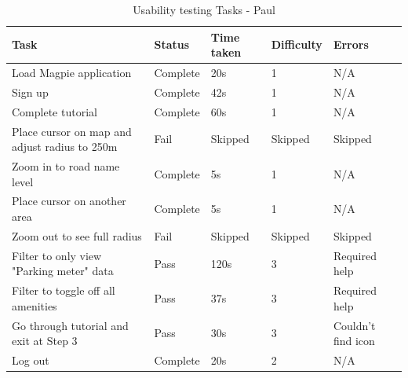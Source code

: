 \begin{table}[h!]
  \centering
  \caption{Usability testing Tasks - Paul}
  \begin{tabular}{|p{}|p{}|p{}|p{}|p{}|}
    \hline
    \textbf{Task}                                 & \textbf{Status} & \textbf{Time taken} & \textbf{Difficulty} & \textbf{Errors}    \\
    \hline
    Load Magpie application                       & Complete        & 20s                 & 1                   & N/A                \\
    \hline
    Sign up                                       & Complete        & 42s                 & 1                   & N/A                \\
    \hline
    Complete tutorial                             & Complete        & 60s                 & 1                   & N/A                \\
    \hline
    Place cursor on map and adjust radius to 250m & Fail            & Skipped             & Skipped             & Skipped            \\
    \hline
    Zoom in to road name level                    & Complete        & 5s                  & 1                   & N/A                \\
    \hline
    Place cursor on another area                  & Complete        & 5s                  & 1                   & N/A                \\
    \hline
    Zoom out to see full radius                   & Fail            & Skipped             & Skipped             & Skipped            \\
    \hline
    Filter to only view "Parking meter" data      & Pass            & 120s                & 3                   & Required help      \\
    \hline
    Filter to toggle off all amenities            & Pass            & 37s                 & 3                   & Required help      \\
    \hline
    Go through tutorial and exit at Step 3        & Pass            & 30s                 & 3                   & Couldn't find icon \\
    \hline
    Log out                                       & Complete        & 20s                 & 2                   & N/A                \\
    \hline
  \end{tabular}
\end{table}

